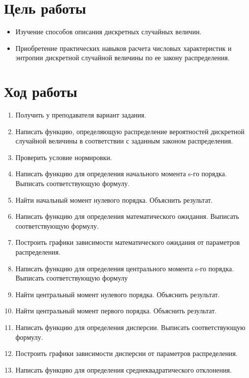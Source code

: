 \documentclass[a4paper,14pt]{extarticle}
\begin{document}

\section{Цель работы}
\begin{itemize}
    \item Изучение способов описания дискретных случайных величин.
    \item Приобретение практических навыков расчета числовых характеристик
          и энтропии дискретной случайной величины по ее закону распределения.
\end{itemize}

\section{Ход работы}
\begin{enumerate}
    \item Получить у преподавателя вариант задания.
    \item Написать функцию, определяющую распределение вероятностей
          дискретной случайной величины в соответствии с заданным
          законом распределения.
    \item Проверить условие нормировки.
    \item Написать функцию для определения начального момента s-го порядка.
          Выписать соответствующую формулу.
    \item Найти начальный момент нулевого порядка. Объяснить результат.
    \item Написать функцию для определения математического ожидания.
          Выписать соответствующую формулу.
    \item Построить графики зависимости математического ожидания от параметров
          распределения.
    \item Написать функцию для определения центрального момента s-го порядка.
          Выписать соответствующую формулу
    \item Найти центральный момент нулевого порядка. Объяснить результат.
    \item Найти центральный момент первого порядка. Объяснить результат.
    \item Написать функцию для определения дисперсии. Выписать
          соответствующую формулу.
    \item Построить графики зависимости дисперсии от параметров распределения.
    \item Написать функцию для определения среднеквадратического отклонения.

\end{enumerate}
\end{document}
